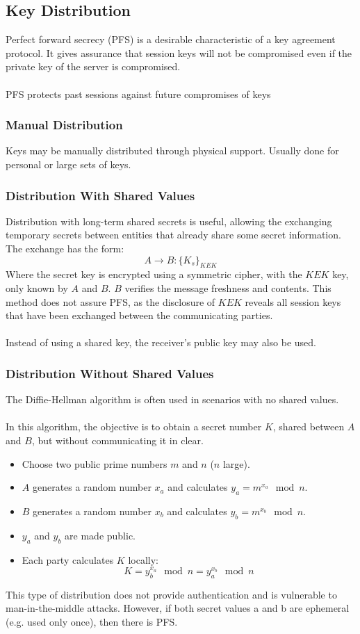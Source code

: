 \documentclass[10pt,a4paper]{report}
\begin{document}
\subsection{Key Distribution}
Perfect forward secrecy (PFS) is a desirable characteristic of a key agreement protocol. It gives assurance that session keys will not be compromised even if the private key of the server is compromised.\\
\\
PFS protects past sessions against future compromises of keys
\subsubsection{Manual Distribution}
Keys may be manually distributed through physical support. Usually done for personal or large sets of keys.
\subsubsection{Distribution With Shared Values}
Distribution with long-term shared secrets is useful, allowing the  exchanging temporary secrets between entities that already share some secret information. The exchange has the form:
$$
A \rightarrow B:\{K_s\}_{KEK}
$$
Where the secret key is encrypted using a symmetric cipher, with the $KEK$ key, only known by $A$ and $B$. $B$ verifies the message freshness and contents. This method does not assure PFS, as the disclosure of $KEK$  reveals all session keys that have been exchanged between the communicating parties.\\
\\
Instead of using a shared key, the receiver's public key may also be used.
\subsubsection{Distribution Without Shared Values}
The Diffie-Hellman algorithm is often used in scenarios with no shared values.\\
\\
In this algorithm, the objective is to obtain a secret number $K$, shared between $A$ and $B$, but without communicating it in clear.
\begin{itemize}
\item Choose two public prime numbers $m$ and $n$ ($n$ large).
\item $A$ generates a random number $x_a$ and calculates $y_a = m^{x_a} \mod n$.
\item $B$ generates a random number $x_b$ and calculates $y_b = m^{x_b} \mod n$.
\item $y_a$ and $y_b$ are made public.
\item Each party calculates $K$ locally:
$$
K = y_b^{x_a} \mod n = y_a^{x_b} \mod n
$$
\end{itemize}
This type of distribution does not provide authentication and is vulnerable to man-in-the-middle attacks. However, if both secret values a and b are ephemeral (e.g. used only once), then there is PFS.
\end{document}
